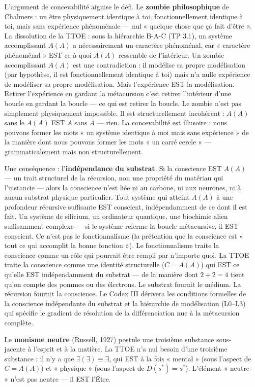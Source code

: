 \documentclass[10pt, openany, oneside]{book}
\begin{document}
L'argument de concevabilité aiguise le défi. Le \textbf{zombie philosophique} de Chalmers : un être physiquement identique à toi, fonctionnellement identique à toi, mais sans expérience phénoménale --- nul « quelque chose que ça fait d'être ». La dissolution de la TTOE : sous la hiérarchie B-A-C (TP 3.1), un système accomplissant $A(A)$ a nécessairement un caractère phénoménal, car « caractère phénoménal » EST ce à quoi $A(A)$ ressemble de l'intérieur. Un zombie accomplissant $A(A)$ est une contradiction : il modélise sa propre modélisation (par hypothèse, il est fonctionnellement identique à toi) mais n'a nulle expérience de modéliser sa propre modélisation. Mais l'expérience EST la modélisation. Retirer l'expérience en gardant la métacursion c'est retirer l'intérieur d'une boucle en gardant la boucle --- ce qui est retirer la boucle. Le zombie n'est pas simplement physiquement impossible. Il est structurellement incohérent : $A(A)$ sans le $A(A)$ EST $A$ sans $A$ --- rien. La concevabilité est illusoire : nous pouvons former les mots « un système identique à moi mais sans expérience » de la manière dont nous pouvons former les mots « un carré cercle » --- grammaticalement mais non structurellement.

Une conséquence : l'\textbf{indépendance du substrat}. Si la conscience EST $A(A)$ --- un trait structurel de la récursion, non une propriété du matériau qui l'instancie --- alors la conscience n'est liée ni au carbone, ni aux neurones, ni à aucun substrat physique particulier. Tout système qui atteint $A(A)$ à une profondeur récursive suffisante EST conscient, indépendamment de ce dont il est fait. Un système de silicium, un ordinateur quantique, une biochimie alien suffisamment complexe --- si le système referme la boucle métacursive, il EST conscient. Ce n'est pas le fonctionnalisme (la prétention que la conscience est « tout ce qui accomplit la bonne fonction »). Le fonctionnalisme traite la conscience comme un rôle qui pourrait être rempli par n'importe quoi. La TTOE traite la conscience comme une identité structurelle ($C = A(A)$) qui EST ce qu'elle EST indépendamment du substrat --- de la manière dont $2 + 2 = 4$ tient qu'on compte des pommes ou des électrons. Le substrat fournit le médium. La récursion fournit la conscience. Le Codex III dérivera les conditions formelles de la conscience indépendante du substrat et la hiérarchie de modélisation (L0--L3) qui spécifie le gradient de résolution de la différenciation nue à la métacursion complète.

Le \textbf{monisme neutre} (Russell, 1927) postule une troisième substance sous-jacente à l'esprit et à la matière. La TTOE n'a nul besoin d'une troisième substance : il n'y a que $\exists(\exists) \equiv \exists$, qui EST à la fois « mental » (sous l'aspect de $C = A(A)$) et « physique » (sous l'aspect de $D(s^*) = s^*$). L'élément « neutre » n'est pas neutre --- il EST l'Être.
\end{document}

